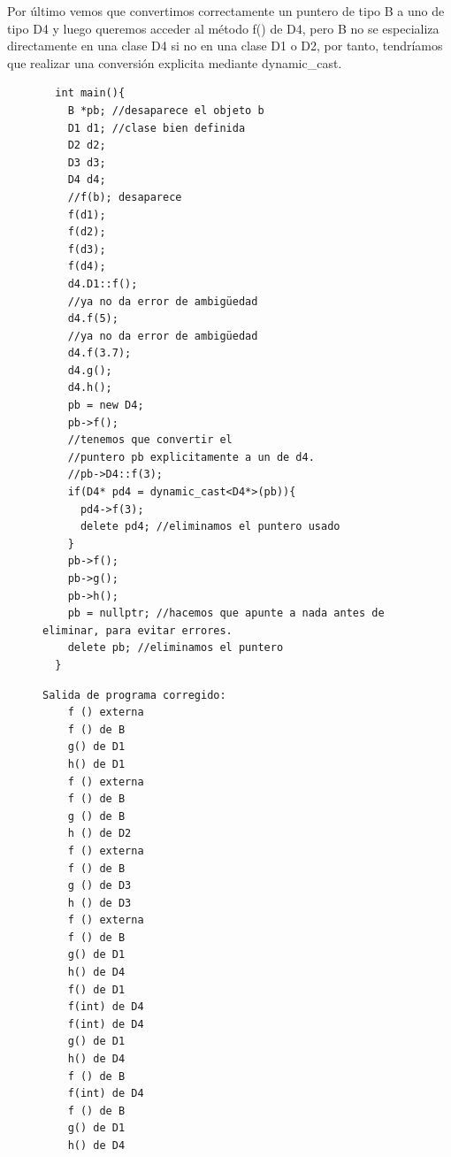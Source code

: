   Por último vemos que convertimos correctamente un puntero de tipo B a uno de tipo D4 y luego queremos acceder al método f() de D4, pero B no se especializa directamente en una clase D4 si no en una clase D1 o D2, por tanto, tendríamos que realizar una conversión explicita mediante dynamic\_cast.
\newpage
\begin{figure}[h]
\begin{minipage}{0.5\textwidth}
\begin{verbatim}
  int main(){
    B *pb; //desaparece el objeto b
    D1 d1; //clase bien definida
    D2 d2;
    D3 d3;
    D4 d4;
    //f(b); desaparece
    f(d1); 
    f(d2);
    f(d3);
    f(d4); 
    d4.D1::f();
    //ya no da error de ambigüedad
    d4.f(5); 
    //ya no da error de ambigüedad
    d4.f(3.7); 
    d4.g();
    d4.h();
    pb = new D4;
    pb->f();
    //tenemos que convertir el 
    //puntero pb explicitamente a un de d4.
    //pb->D4::f(3); 
    if(D4* pd4 = dynamic_cast<D4*>(pb)){
      pd4->f(3);
      delete pd4; //eliminamos el puntero usado
    }
    pb->f();
    pb->g();
    pb->h();
    pb = nullptr; //hacemos que apunte a nada antes de eliminar, para evitar errores.
    delete pb; //eliminamos el puntero
  }
\end{verbatim}
\end{minipage}
\hfill
\begin{minipage}{0.35\textwidth}
  \begin{lstlisting}[frame = single]
  Salida de programa corregido:
    f () externa 
    f () de B
    g() de D1
    h() de D1
    f () externa 
    f () de B
    g () de B
    h () de D2 
    f () externa 
    f () de B
    g () de D3 
    h () de D3 
    f () externa 
    f () de B
    g() de D1
    h() de D4
    f() de D1
    f(int) de D4
    f(int) de D4
    g() de D1
    h() de D4
    f () de B
    f(int) de D4
    f () de B
    g() de D1
    h() de D4
  \end{lstlisting}
\end{minipage}
\end{figure}